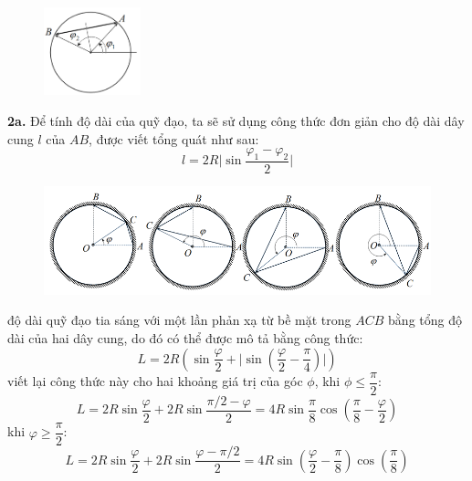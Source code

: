 \begin{figure}
  \centering
  \includegraphics[width=0.25\textwidth]{Figures/P3/Fig 3.6S.png}
\end{figure}

\noindent\textbf{2a.} Để tính độ dài của quỹ đạo, ta sẽ sử dụng công thức đơn giản cho độ dài dây cung $l$ của $AB$, được viết tổng quát như sau:
\begin{equation}
  \label{eq:327}
  l=2R\lvert\sin\frac{\varphi_{1}-\varphi_{2}}{2}\rvert
\end{equation}
\begin{figure}[h]
  \centering
  \vspace{1cm}
  \includegraphics[width=1\textwidth]{Figures/P3/Fig 3.7S.png}
\end{figure}

\noindent độ dài quỹ đạo tia sáng với một lần phản xạ từ bề mặt trong $ACB$ bằng tổng độ dài của hai dây cung, do đó có thể được mô tả bằng công thức:
\begin{equation}
  \label{eq:328}
  L=2R\left(\sin\frac{\varphi}{2}+\lvert\sin\left(\frac{\varphi}{2}-\frac{\pi}{4}\right)\rvert\right)
\end{equation}
viết lại công thức này cho hai khoảng giá trị của góc $\phi$, khi $\phi \leqslant \dfrac{\pi}{2}$:
\begin{equation}
  \label{eq:329}
  L=2R\sin\frac{\varphi}{2}+2R\sin\frac{\pi/2-\varphi}{2}=4R\sin\frac{\pi}{8}\cos\left(\frac{\pi}{8}-\frac{\varphi}{2}\right)
\end{equation}
khi $\varphi\geqslant\dfrac{\pi}{2}$:
\begin{equation}
  \label{eq:330}
  L=2R\sin\frac{\varphi}{2}+2R\sin\frac{\varphi-\pi/2}{2}=4R\sin\left(\frac{\varphi}{2}-\frac{\pi}{8}\right)\cos\left(\frac{\pi}{8}\right)
\end{equation}

